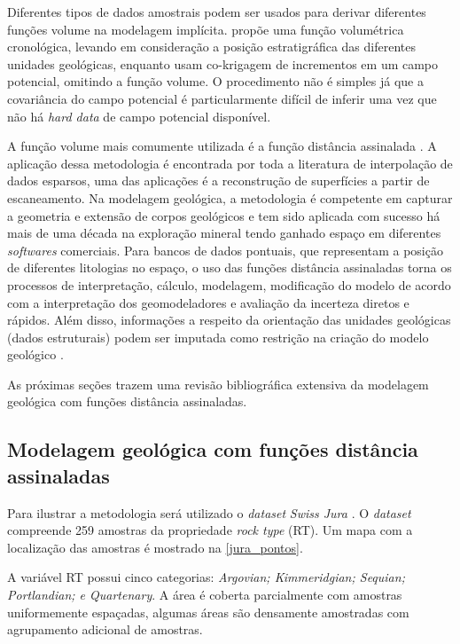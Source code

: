 Diferentes tipos de dados amostrais podem ser usados para derivar diferentes funções volume na modelagem implícita.  propõe uma função volumétrica cronológica, levando em consideração a posição estratigráfica das diferentes unidades geológicas, enquanto  usam co-krigagem de incrementos em um campo potencial, omitindo a função volume. O procedimento não é simples já que a covariância do campo potencial é particularmente difícil de inferir uma vez que não há \textit{hard data} de campo potencial disponível.

A função volume mais comumente utilizada é a função distância assinalada \cite{osherlevelsetmethods}. A aplicação dessa metodologia é encontrada por toda a literatura de interpolação de dados esparsos, uma das aplicações é a reconstrução de superfícies a partir de escaneamento. Na modelagem geológica, a metodologia é competente em capturar a geometria e extensão de corpos geológicos e tem sido aplicada com sucesso há mais de uma década na exploração mineral tendo ganhado espaço em diferentes \textit{softwares} comerciais. Para bancos de dados pontuais, que representam a posição  de diferentes litologias no espaço, o uso das funções distância assinaladas torna os processos de interpretação, cálculo, modelagem, modificação do modelo de acordo com a interpretação dos geomodeladores e avaliação da incerteza diretos e rápidos. Além disso, informações a respeito da orientação das unidades geológicas (dados estruturais) podem ser imputada como restrição na criação do modelo geológico \cite{martin2017implicitmodeling}.

As próximas seções trazem uma revisão bibliográfica extensiva da modelagem geológica com funções distância assinaladas.

\subsection{Modelagem geológica com funções distância assinaladas}

Para  ilustrar a metodologia será utilizado o \textit{dataset} \textit{Swiss Jura} \cite{goovaerts1997geostatistics}. O \textit{dataset} compreende 259 amostras da propriedade \textit{rock type} (RT). Um mapa com a localização das amostras é mostrado na \autoref{jura_pontos}.

A variável RT possui cinco categorias: \textit{Argovian; Kimmeridgian; Sequian;
Portlandian; e Quartenary}. A área é coberta parcialmente com amostras uniformemente espaçadas, algumas áreas são densamente amostradas com agrupamento adicional de amostras.

